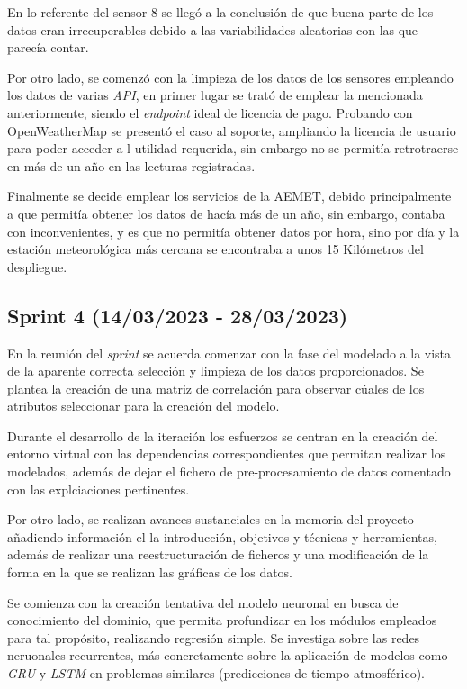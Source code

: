 En lo referente del sensor 8 se llegó a la conclusión de que buena parte de los datos eran irrecuperables debido a las variabilidades aleatorias 
con las que parecía contar.

Por otro lado, se comenzó con la limpieza de los datos de los sensores empleando los datos de varias \textit{API}, en primer lugar se trató de emplear
la mencionada anteriormente, siendo el \textit{endpoint} ideal de licencia de pago.
Probando con OpenWeatherMap se presentó el caso al soporte, ampliando la licencia de usuario para poder acceder a l utilidad requerida, sin embargo no
se permitía retrotraerse en más de un año en las lecturas registradas.

Finalmente se decide emplear los servicios de la AEMET, debido principalmente a que permitía obtener los datos de hacía más de un año, sin embargo, contaba
con inconvenientes, y es que no permitía obtener datos por hora, sino por día y la estación meteorológica más cercana se encontraba a unos 15 Kilómetros
del despliegue.

\subsection{Sprint 4 (14/03/2023 - 28/03/2023)}
En la reunión del \textit{sprint} se acuerda comenzar con la fase del modelado a la vista de la aparente correcta selección y limpieza de los datos 
proporcionados.
Se plantea la creación de una matriz de correlación para observar cúales de los atributos seleccionar para la creación del modelo.

Durante el desarrollo de la iteración los esfuerzos se centran en la creación del entorno virtual con las dependencias correspondientes que permitan 
realizar los modelados, además de dejar el fichero de pre-procesamiento de datos comentado con las explciaciones pertinentes.

Por otro lado, se realizan avances sustanciales en la memoria del proyecto añadiendo información el la introducción, objetivos y técnicas y herramientas,
además de realizar una reestructuración de ficheros y una modificación de la forma en la que se realizan las gráficas de los datos.

Se comienza con la creación tentativa del modelo neuronal en busca de conocimiento del dominio, que permita profundizar en los módulos empleados para tal
propósito, realizando regresión simple.
Se investiga sobre las redes neruonales recurrentes, más concretamente sobre la aplicación de modelos como \textit{GRU} y \textit{LSTM} en problemas
similares (predicciones de tiempo atmosférico).


